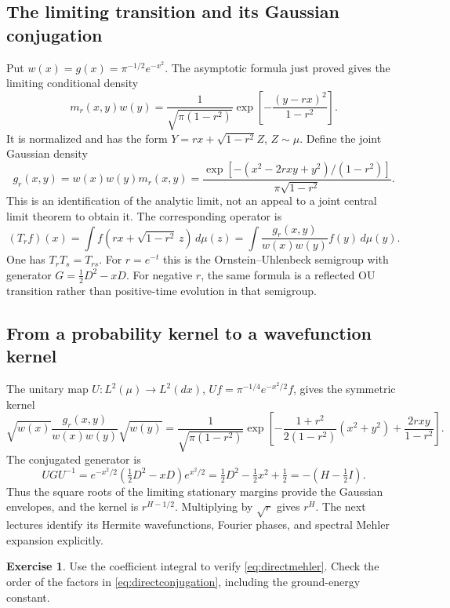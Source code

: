\documentclass[11pt,reqno]{amsart}
\theoremstyle{definition}
\newtheorem{exercise}[theorem]{Exercise}
\theoremstyle{remark}
\newcommand{\Id}{I}
\begin{document}
\subsection{The limiting transition and its Gaussian conjugation}
Put $w(x)=g(x)=\pi^{-1/2}e^{-x^2}$. The asymptotic formula just proved
gives the limiting conditional density
\[
m_r(x,y)w(y)=\frac1{\sqrt{\pi(1-r^2)}}
\exp\left[-\frac{(y-rx)^2}{1-r^2}\right].
\]
It is normalized and has the form
$Y=rx+\sqrt{1-r^2}Z$, $Z\sim\mu$. Define the joint Gaussian density
\begin{equation}\label{eq:jointgauss}
g_r(x,y)=w(x)w(y)m_r(x,y)
=\frac{\exp[-(x^2-2rxy+y^2)/(1-r^2)]}{\pi\sqrt{1-r^2}}.
\end{equation}
This is an identification of the analytic limit, not an appeal to a
joint central limit theorem to obtain it.
The corresponding operator is
\begin{equation}\label{eq:directOU}
(T_rf)(x)=\int f(rx+\sqrt{1-r^2}\,z)\,d\mu(z)
=\int\frac{g_r(x,y)}{w(x)w(y)}f(y)\,d\mu(y).
\end{equation}
One has $T_rT_s=T_{rs}$. For $r=e^{-t}$ this is the
Ornstein--Uhlenbeck semigroup with generator $G=\frac12D^2-xD$.
For negative $r$, the same formula is a reflected OU transition rather
than positive-time evolution in that semigroup.

\subsection{From a probability kernel to a wavefunction kernel}
The unitary map $U:L^2(\mu)\to L^2(dx)$,
$Uf=\pi^{-1/4}e^{-x^2/2}f$, gives the symmetric kernel
\begin{equation}\label{eq:wavefromratio}
\sqrt{w(x)}\frac{g_r(x,y)}{w(x)w(y)}\sqrt{w(y)}
=\frac1{\sqrt{\pi(1-r^2)}}
\exp\left[-\frac{1+r^2}{2(1-r^2)}(x^2+y^2)+\frac{2rxy}{1-r^2}\right].
\end{equation}
The conjugated generator is
\begin{equation}\label{eq:directconjugation}
UGU^{-1}=e^{-x^2/2}(\tfrac12D^2-xD)e^{x^2/2}
=\tfrac12D^2-\tfrac12x^2+\tfrac12=-(H-\tfrac12\Id).
\end{equation}
Thus the square roots of the limiting stationary margins provide the
Gaussian envelopes, and the kernel is $r^{H-1/2}$. Multiplying by
$\sqrt r$ gives $r^H$. The next lectures identify its Hermite
wavefunctions, Fourier phases, and spectral Mehler expansion explicitly.

\begin{exercise}
Use the coefficient integral to verify \eqref{eq:directmehler}. Check the order of the factors in
\eqref{eq:directconjugation}, including the ground-energy constant.
\end{exercise}
\end{document}
